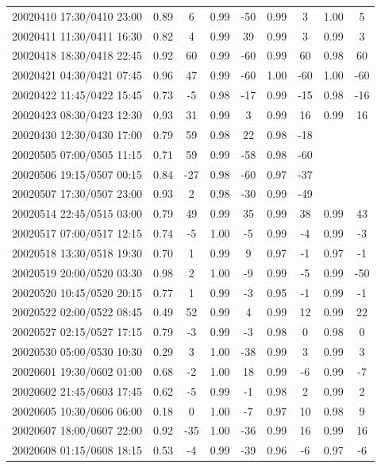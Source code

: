 \documentclass[linenumbers,draft]{agujournal}
\begin{document}
\begin{center}
\begin{longtable}{c||cc|cc|cc|cc}
20020410 17:30/0410 23:00 & 0.89 & 6 & 0.99 & -50 & 0.99 & 3 & 1.00 & 5 \\
20020411 11:30/0411 16:30 & 0.82 & 4 & 0.99 & 39 & 0.99 & 3 & 0.99 & 3 \\
20020418 18:30/0418 22:45 & 0.92 & 60 & 0.99 & -60 & 0.99 & 60 & 0.98 & 60 \\
20020421 04:30/0421 07:45 & 0.96 & 47 & 0.99 & -60 & 1.00 & -60 & 1.00 & -60 \\
20020422 11:45/0422 15:45 & 0.73 & -5 & 0.98 & -17 & 0.99 & -15 & 0.98 & -16 \\
20020423 08:30/0423 12:30 & 0.93 & 31 & 0.99 & 3 & 0.99 & 16 & 0.99 & 16 \\
20020430 12:30/0430 17:00 & 0.79 & 59 & 0.98 & 22 & 0.98 & -18 &  &  \\
20020505 07:00/0505 11:15 & 0.71 & 59 & 0.99 & -58 & 0.98 & -60 &  &  \\
20020506 19:15/0507 00:15 & 0.84 & -27 & 0.98 & -60 & 0.97 & -37 &  &  \\
20020507 17:30/0507 23:00 & 0.93 & 2 & 0.98 & -30 & 0.99 & -49 &  &  \\
20020514 22:45/0515 03:00 & 0.79 & 49 & 0.99 & 35 & 0.99 & 38 & 0.99 & 43 \\
20020517 07:00/0517 12:15 & 0.74 & -5 & 1.00 & -5 & 0.99 & -4 & 0.99 & -3 \\
20020518 13:30/0518 19:30 & 0.70 & 1 & 0.99 & 9 & 0.97 & -1 & 0.97 & -1 \\
20020519 20:00/0520 03:30 & 0.98 & 2 & 1.00 & -9 & 0.99 & -5 & 0.99 & -50 \\
20020520 10:45/0520 20:15 & 0.77 & 1 & 0.99 & -3 & 0.95 & -1 & 0.99 & -1 \\
20020522 02:00/0522 08:45 & 0.49 & 52 & 0.99 & 4 & 0.99 & 12 & 0.99 & 22 \\
20020527 02:15/0527 17:15 & 0.79 & -3 & 0.99 & -3 & 0.98 & 0 & 0.98 & 0 \\
20020530 05:00/0530 10:30 & 0.29 & 3 & 1.00 & -38 & 0.99 & 3 & 0.99 & 3 \\
20020601 19:30/0602 01:00 & 0.68 & -2 & 1.00 & 18 & 0.99 & -6 & 0.99 & -7 \\
20020602 21:45/0603 17:45 & 0.62 & -5 & 0.99 & -1 & 0.98 & 2 & 0.99 & 2 \\
20020605 10:30/0606 06:00 & 0.18 & 0 & 1.00 & -7 & 0.97 & 10 & 0.98 & 9 \\
20020607 18:00/0607 22:00 & 0.92 & -35 & 1.00 & -36 & 0.99 & 16 & 0.99 & 16 \\
20020608 01:15/0608 18:15 & 0.53 & -4 & 0.99 & -39 & 0.96 & -6 & 0.97 & -6 \\

\end{longtable}
\end{center}
\end{document}
